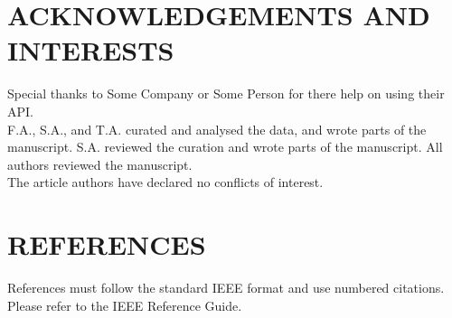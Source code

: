 \documentclass{IEEEoj-data}
\begin{document}
\section*{ACKNOWLEDGEMENTS AND INTERESTS}
Special thanks to Some Company or Some Person for there help on using their API.
\\
\text{\hspace{1em}} F.A., S.A., and T.A. curated and analysed the data, and wrote parts of the manuscript.
S.A. reviewed the curation and wrote parts of the manuscript. All authors reviewed the manuscript.
\\
\text{\hspace{1em}} The article authors have declared no conflicts of interest.
\\

\section*{REFERENCES}
References must follow the standard IEEE format and use numbered citations. Please refer to the IEEE Reference Guide.
\end{document}
